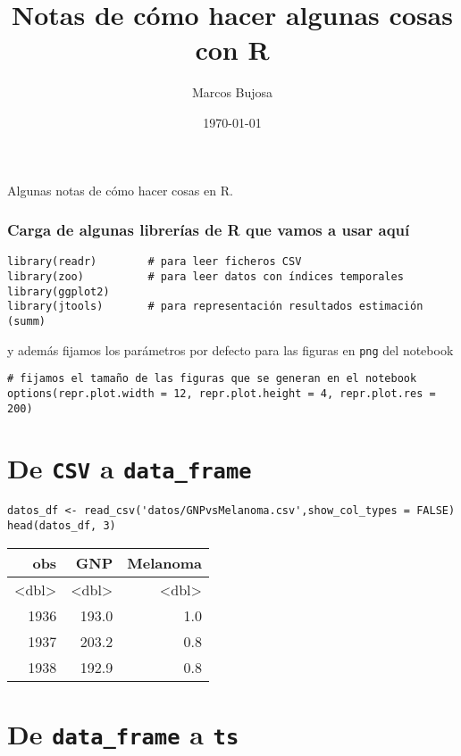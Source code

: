 \documentclass[11pt]{article}
\author{Marcos Bujosa}
\date{\today}
\title{Notas de cómo hacer algunas cosas con R}
\begin{document}
\maketitle

\begin{ABSTRACT}
Algunas notas de cómo hacer cosas en R.
\end{ABSTRACT}
\subsubsection*{Carga de algunas librerías de R que vamos a usar aquí}
\label{sec:org804f088}
\begin{verbatim}
library(readr)        # para leer ficheros CSV
library(zoo)          # para leer datos con índices temporales
library(ggplot2)
library(jtools)       # para representación resultados estimación (summ)
\end{verbatim}
y además fijamos los parámetros por defecto para las figuras en \texttt{png}
del notebook
\begin{verbatim}
# fijamos el tamaño de las figuras que se generan en el notebook
options(repr.plot.width = 12, repr.plot.height = 4, repr.plot.res = 200)
\end{verbatim}
\section{De \texttt{CSV} a \texttt{data\_frame}}
\label{sec:org504daff}

\begin{verbatim}
datos_df <- read_csv('datos/GNPvsMelanoma.csv',show_col_types = FALSE)
head(datos_df, 3)
\end{verbatim}

\label{}
\begin{center}
\begin{tabular}{rrr}
obs & GNP & Melanoma\\
\hline
<dbl> & <dbl> & <dbl>\\
1936 & 193.0 & 1.0\\
1937 & 203.2 & 0.8\\
1938 & 192.9 & 0.8\\
\end{tabular}
\end{center}
\section{De \texttt{data\_frame} a \texttt{ts}}
\label{sec:orga2b3057}
\end{document}
